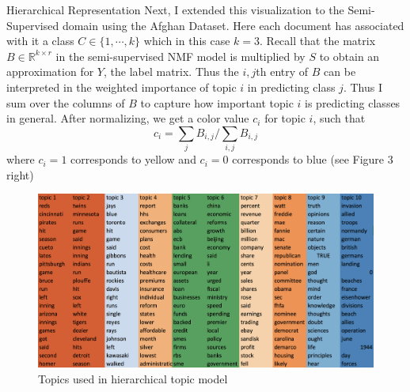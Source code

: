 \documentclass[12pt]{pom_thesis}
\begin{document}
\begin{chapter}{Hierarchical Representation}
Next, I extended this visualization to the Semi-Supervised domain using the Afghan Dataset. Here each document has associated with it a class $C\in \{1,\cdots,k\}$ which in this case $k=3$. Recall that the matrix $B \in \mathbb{R}^{k \times r}$ in the semi-supervised NMF model is multiplied by $S$ to obtain an approximation for $Y$, the label matrix. Thus the $i,j$th entry of $B$ can be interpreted in the weighted importance of topic $i$ in predicting class $j$. Thus I sum over the columns of $B$ to capture how important topic $i$ is predicting classes in general. After normalizing, we get a color value $c_i$ for topic $i$, such that
$$c_i = \sum_j B_{i,j} /  \sum_{i,j} B_{i,j}$$
where $c_i=1$ corresponds to yellow and $c_i=0$ corresponds to blue (see Figure 3 right)
\begin{figure}
	\centering
	\includegraphics[width=7	in]{topic}
	\caption{Topics used in hierarchical topic model}
\end{figure}
\end{chapter}
\end{document}
